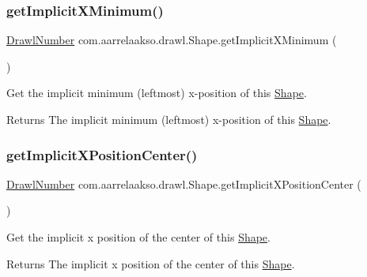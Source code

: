 \subsubsection{\texorpdfstring{get\+Implicit\+X\+Minimum()}{getImplicitXMinimum()}}
{\footnotesize\ttfamily \hyperlink{classcom_1_1aarrelaakso_1_1drawl_1_1_drawl_number}{Drawl\+Number} com.\+aarrelaakso.\+drawl.\+Shape.\+get\+Implicit\+X\+Minimum (\begin{DoxyParamCaption}{ }\end{DoxyParamCaption})\hspace{0.3cm}{\ttfamily [protected]}}



Get the implicit minimum (leftmost) x-\/position of this \hyperlink{classcom_1_1aarrelaakso_1_1drawl_1_1_shape}{Shape}. 

\begin{DoxyReturn}{Returns}
The implicit minimum (leftmost) x-\/position of this \hyperlink{classcom_1_1aarrelaakso_1_1drawl_1_1_shape}{Shape}. 
\end{DoxyReturn}
\mbox{\label{classcom_1_1aarrelaakso_1_1drawl_1_1_shape_ac7a69f5cb9dd954f5054a3bebc35af41}} 
\subsubsection{\texorpdfstring{get\+Implicit\+X\+Position\+Center()}{getImplicitXPositionCenter()}}
{\footnotesize\ttfamily \hyperlink{classcom_1_1aarrelaakso_1_1drawl_1_1_drawl_number}{Drawl\+Number} com.\+aarrelaakso.\+drawl.\+Shape.\+get\+Implicit\+X\+Position\+Center (\begin{DoxyParamCaption}{ }\end{DoxyParamCaption})\hspace{0.3cm}{\ttfamily [protected]}}



Get the implicit x position of the center of this \hyperlink{classcom_1_1aarrelaakso_1_1drawl_1_1_shape}{Shape}. 

\begin{DoxyReturn}{Returns}
The implicit x position of the center of this \hyperlink{classcom_1_1aarrelaakso_1_1drawl_1_1_shape}{Shape}. 
\end{DoxyReturn}
\mbox{\label{classcom_1_1aarrelaakso_1_1drawl_1_1_shape_a3cc59779e8ce4a98ff2309e0fb414527}} 
